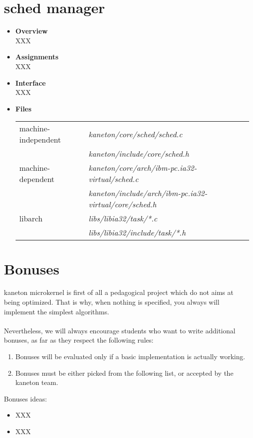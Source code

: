 \section{\textbf{sched} manager}
\begin{itemize}
  \item {\bf Overview}\\

    XXX

  \item {\bf Assignments}\\

    XXX

  \item {\bf Interface}\\

    XXX

  \item {\bf Files}\\

    \begin{tabular}{| l | l |}
      \hline
      machine-independent & {\em kaneton/core/sched/sched.c}\\
      &  {\em kaneton/include/core/sched.h}\\\hline
      machine-dependent & {\em kaneton/core/arch/ibm-pc.ia32-virtual/sched.c}\\
      & {\em kaneton/include/arch/ibm-pc.ia32-virtual/core/sched.h}\\\hline
      libarch & {\em libs/libia32/task/*.c}\\
      &  {\em libs/libia32/include/task/*.h}\\\hline
    \end{tabular}

\end{itemize}

%
%

\newpage

\section{Bonuses}

kaneton microkernel is first of all a pedagogical project which do not
aims at being optimized. That is why, when nothing is specified, you
always will implement the simplest algorithms.\\
\\
Nevertheless, we will always encourage students who want to write
additional bonuses, as far as they respect the following rules:

\begin{enumerate}
  \item Bonuses will be evaluated only if a basic implementation is
  actually working.
  \item Bonuses must be either picked from the following list, or
  accepted by the kaneton team.\\
\end{enumerate}

Bonuses ideas:
\begin{itemize}
\item XXX
\item XXX
\end{itemize}


